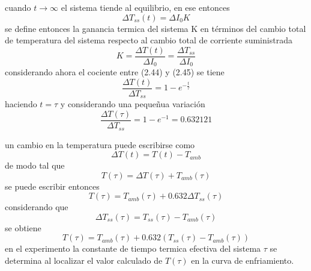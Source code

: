 cuando $t \xrightarrow{}\infty$ el sistema tiende al equilibrio, en ese entonces 
\begin{equation}
     \Delta T_{ss}(t) =\Delta I_{0}K
\end{equation}
se define entonces la ganancia termica del sistema K en términos del cambio total de temperatura del sistema respecto al cambio total de corriente suministrada 
\begin{equation}
    K = \frac{\Delta T(t)}{\Delta I_{0}}=\frac{\Delta T_{ss}}{\Delta I_{0}}
\end{equation}
considerando ahora el cociente entre (2.44) y (2.45) se tiene 
\begin{equation}
    \frac{\Delta T(t)}{\Delta T_{ss}}=1-e^{-\frac{t}{\tau}}
\end{equation}
haciendo $t=\tau$ y considerando una pequeñua variación  
\begin{equation}
     \frac{\Delta T(\tau)}{\Delta T_{ss}}=1-e^{-1}=0.632121
\end{equation}

un cambio en la temperatura puede escribirse como 
\begin{equation}
    \Delta T(t)= T(t)-T_{amb}
\end{equation}
de modo tal que 
\begin{equation}
    T(\tau)= \Delta T(\tau)+ T_{amb}(\tau)
\end{equation}
se puede escribir entonces 
\begin{equation}
    T(\tau)= T_{amb}(\tau) + 0.632\Delta T_{ss}(\tau) 
\end{equation}
considerando que 
\begin{equation}
    \Delta T_{ss}(\tau)= T_{ss}(\tau) - T_{amb}(\tau)
\end{equation}
se obtiene 
\begin{equation}
     T(\tau)= T_{amb}(\tau) + 0.632( T_{ss}(\tau) - T_{amb}(\tau))
\end{equation}
en el experimento la constante de tiempo termica efectiva del sistema $\tau$ se determina al localizar el valor calculado de $T(\tau)$ en la curva de enfriamiento.
